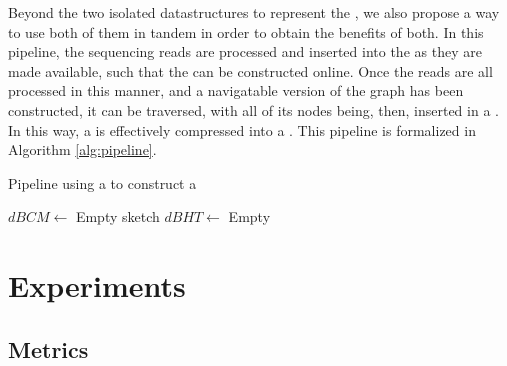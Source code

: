 Beyond the two isolated datastructures to represent the \dBG, we also propose a way to use both of them in tandem in order to obtain
the benefits of both. In this pipeline, the sequencing reads are processed and inserted into the \dBCM as they are made available,
such that the \dBG can be constructed online. Once the reads are all processed in this manner, and a navigatable version of the graph 
has been constructed, it can be traversed, with all of its nodes being, then, inserted in a \dBHT. In this way, a \dBCM is effectively
compressed into a \dBHT. This pipeline is formalized in Algorithm \ref{alg:pipeline}.

\begin{algorithm}
  \caption{Pipeline using a \dBCM to construct a \dBHT}\label{alg:pipeline}
  $\mathit{dBCM} \gets$ Empty \dBCM sketch\;
  $\mathit{dBHT} \gets$ Empty \dBHT\;
\end{algorithm}

\section{Experiments}

\subsection{Metrics}


